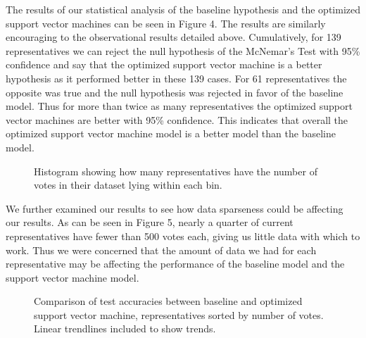 \documentclass[11pt,letterpaper,twocolumn]{article}
\begin{document}
The results of our statistical analysis of the baseline hypothesis and the optimized support vector machines can be seen in Figure 4. The results are similarly encouraging to the observational results detailed above. Cumulatively, for 139 representatives we can reject the null hypothesis of the McNemar's Test with 95\% confidence and say that the optimized support vector machine is a better hypothesis as it performed better in these 139 cases. For 61 representatives the opposite was true and the null hypothesis was rejected in favor of the baseline model. Thus for more than twice as many representatives the optimized support vector machines are better with 95\% confidence. This indicates that overall the optimized support vector machine model is a better model than the baseline model.

\begin{figure}
\centering
{}
\caption{Histogram showing how many representatives have the number of votes in their dataset lying within each bin.}
\end{figure}

We further examined our results to see how data sparseness could be affecting our results. As can be seen in Figure 5, nearly a quarter of current representatives have fewer than 500 votes each, giving us little data with which to work. Thus we were concerned that the amount of data we had for each representative may be affecting the performance of the baseline model and the support vector machine model.

\begin{figure}[t]
\centering
{}
\caption{Comparison of test accuracies between baseline and optimized support vector machine, representatives sorted by number of votes. Linear trendlines included to show trends.}
\end{figure}
\end{document}
